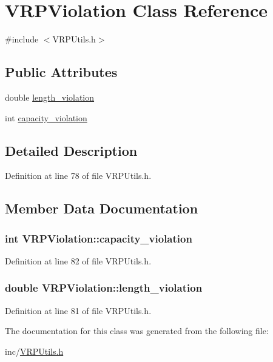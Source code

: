 \hypertarget{class_v_r_p_violation}{
\section{VRPViolation Class Reference}
\label{class_v_r_p_violation}
}


{\ttfamily \#include $<$VRPUtils.h$>$}

\subsection*{Public Attributes}
\begin{DoxyCompactItemize}
\item 
double \hyperlink{class_v_r_p_violation_a745d465bc644b7a1ebaa85434daffbef}{length\_\-violation}
\item 
int \hyperlink{class_v_r_p_violation_a3e88c1528a41d01a65b9322937fa0cf0}{capacity\_\-violation}
\end{DoxyCompactItemize}


\subsection{Detailed Description}


Definition at line 78 of file VRPUtils.h.



\subsection{Member Data Documentation}
\hypertarget{class_v_r_p_violation_a3e88c1528a41d01a65b9322937fa0cf0}{
\subsubsection[{capacity\_\-violation}]{\setlength{\rightskip}{0pt plus 5cm}int {\bf VRPViolation::capacity\_\-violation}}}
\label{class_v_r_p_violation_a3e88c1528a41d01a65b9322937fa0cf0}


Definition at line 82 of file VRPUtils.h.

\hypertarget{class_v_r_p_violation_a745d465bc644b7a1ebaa85434daffbef}{
\subsubsection[{length\_\-violation}]{\setlength{\rightskip}{0pt plus 5cm}double {\bf VRPViolation::length\_\-violation}}}
\label{class_v_r_p_violation_a745d465bc644b7a1ebaa85434daffbef}


Definition at line 81 of file VRPUtils.h.



The documentation for this class was generated from the following file:\begin{DoxyCompactItemize}
\item 
inc/\hyperlink{_v_r_p_utils_8h}{VRPUtils.h}\end{DoxyCompactItemize}
